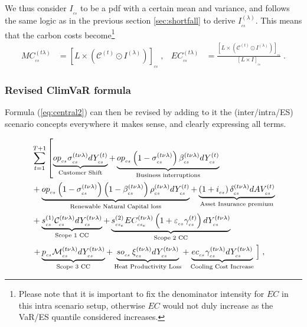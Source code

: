\vspace{0.2cm}

We thus consider $I_{_{cs}}$  to be a pdf with a certain mean and variance, and follows the same logic as in the previous section \ref{sec:shortfall} to derive $I^{(\lambda)}_{_{cs}}$. This means that the carbon costs become\footnote{Please note that it is important to fix the denominator intensity for $EC$ in this intra scenario setup, otherwise $EC$ would not duly increase as the VaR/ES quantile considered increases.}
\begin{align}
MC^{(t\lambda)}_{_{cs}}&=\left[L \times \left(
%
\mathcal{C}^{(t)}\odot I^{(\lambda)}\right) \right]_{_{cs}}\;,&
%
EC^{(t\lambda)}_{_{cs}}&=\frac{\left[L \times \left(
%
 \mathcal{C}^{(t)}\odot I^{(\lambda)}\right) \right]_{_{cs}}}{\left[L \times
%
 I \right]_{_{cs}}}\;.
\end{align}

\subsubsection{Revised ClimVaR formula}



Formula (\ref{eq:central2}) can then be revised by adding to it the (inter/intra/ES) scenario concepts everywhere it makes sense, and clearly expressing all terms. 
 
\begin{tcolorbox}[colback=red!5!white,colframe=red!70!black,title=\textbf{Extended ClimVaR central $\text{VaR}^{(E\nu\lambda)}_{_{cs}}$ formula with scenarios },halign title=flush center]
\vspace{-0.4cm}
\begin{align}
&\sum_{t=1}^{T+1}\left[\underbrace{op_{_{cs}}\sigma^{(t\nu\lambda)}_{_{cs}}dY^{(t)}_{_{cs}}}_{\text{Customer Shift}}
%
+\underbrace{op_{_{cs}}\left(1-\sigma^{(t\nu\lambda)}_{_{cs}}\right) \beta^{(t\nu\lambda)}_{_{cs}}dY^{(t)}_{_{cs}}}_{\text{Business interruptions}}\right.\notag\\
%
&+\underbrace{op_{_{cs}}\left(1-\sigma^{(t\nu\lambda)}_{_{cs}}\right)\left(1-\beta^{(t\nu\lambda)}_{_{cs}}\right)  \rho^{(t\nu\lambda)}_{_{cs}}dY^{(t)}_{_{cs}}}_{\text{Renewable Natural Capital loss}}
%
+\underbrace{\left(1+i_{_{cs}}\right) \delta^{(t\nu\lambda)}_{_{cs}}dAV^{(t)}_{_{cs}}}_{\text{Asset Insurance premium}}\notag\\
%
&+\underbrace{s^{(1)}_{_{cs}}\mathcal{C}^{(t\nu\lambda)}_{_{cs}}dY^{(t\nu\lambda)}_{_{cs}}}_{\text{Scope 1 CC}}+
%
\underbrace{s^{(2)}_{_{cs_e}}EC^{(t\nu\lambda)}_{_{cs_e}}\left(1+  \varepsilon_{_{cs}}\gamma^{(t)}_{_{cs}}\right)dY^{(t\nu\lambda)}_{_{cs}}}_{\text{Scope 2 CC}}\notag\\
%
&\left. +\underbrace{p_{_{cs}}\mathcal{M}^{(t\nu\lambda)}_{_{cs}}dY^{(t\nu\lambda)}_{_{cs}}}_{\text{Scope 3 CC}}
%
+\underbrace{so_{_{cs}}\, \xi^{(t\nu\lambda)}_{_{cs}}dY^{(t\nu\lambda)}_{_{cs}}}_{\text{Heat Productivity Loss}}
%
+\underbrace{ec_{_{cs}} \gamma^{(t\nu\lambda)}_{_{cs}}dY^{(t\nu\lambda)}_{_{cs}}}_{\text{Cooling Cost Increase}}
%
\right. \Big]\;,\label{eq:central-scenar}
\end{align}
\end{tcolorbox}

